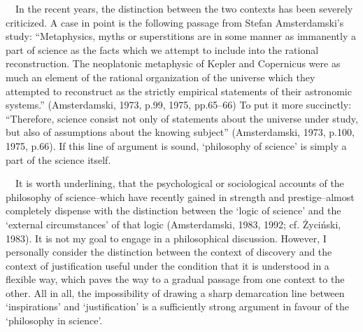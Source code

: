 \documentclass[a4paper]{article}
\begin{document}
\ \ In the recent years, the distinction between the two contexts has been severely criticized. A case in point is the
following passage from Stefan Amsterdamski’s study: %
“Metaphysics, myths or superstitions are in some manner as immanently a part of science as the facts which we attempt to
include into the rational reconstruction. The neoplatonic metaphysic of Kepler and Copernicus were as much an element
of the rational organization of the universe which they attempted to reconstruct as the strictly empirical statements
of their astronomic systems.” \label{ref:RNDU9z9ka2JPW}(Amsterdamski, 1973, p.99, 1975, pp.65–66) To put it more
succinctly: %
“Therefore, science consist not only of statements about the universe under study, but also of assumptions about the
knowing subject” \label{ref:RNDhNkCU0uqR3}(Amsterdamski, 1973, p.100, 1975, p.66). If this line of argument is sound,
‘philosophy of science’ is simply a part of the science itself.

\ \ It is worth underlining, that the psychological or sociological accounts of the philosophy of science–which have
recently gained in strength and prestige–almost completely dispense with the distinction between the ‘logic of science’
and the ‘external circumstances’ of that logic \label{ref:RND1eO94kZzna}(Amsterdamski, 1983, 1992; cf. Życiński, 1983).
It is not my goal to engage in a philosophical discussion. However, I personally consider the distinction between the
context of discovery and the context of justification useful under the condition that it is  understood in a flexible
way, which paves the way to a gradual passage from one  context to the other. All in all, the impossibility of drawing
a sharp demarcation line between ‘inspirations’ and ‘justification’ is a sufficiently strong argument in favour of the
‘philosophy in science’.
\end{document}
